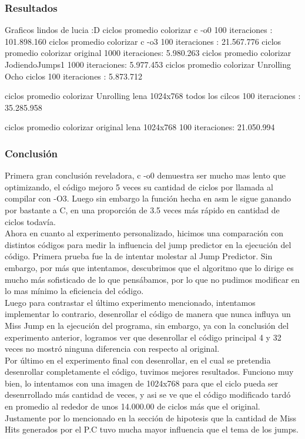 \subsubsection{Resultados}
	Graficos lindos de lucia :D
	ciclos promedio colorizar c -o0 100 iteraciones : 101.898.160
	ciclos promedio colorizar c -o3 100 iteraciones : 21.567.776
	ciclos promedio colorizar original 1000 iteraciones: 5.980.263
	ciclos promedio colorizar JodiendoJumps1 1000 iteraciones: 5.977.453
	ciclos promedio colorizar Unrolling Ocho ciclos 100 iteraciones : 5.873.712
	
	
	
	ciclos promedio colorizar Unrolling lena 1024x768
	 todos los cilcos 100 iteraciones : 35.285.958
	
	ciclos promedio colorizar original lena 1024x768 100 iteraciones:	21.050.994
	
	
	
\subsubsection{Conclusión}
 Primera gran conclusión reveladora, c -o0 demuestra ser mucho mas lento que optimizando, el código mejoro 5 veces su cantidad de ciclos por llamada al compilar con -O3.
  Luego sin embargo la función hecha en asm le sigue ganando por bastante a C, en una proporción de 3.5 veces más rápido en cantidad de ciclos todavía.\\
  Ahora en cuanto al experimento personalizado, hicimos una comparación con distintos códigos para medir la influencia del jump predictor en la ejecución del código. Primera prueba fue la de intentar molestar al Jump Predictor. Sin embargo, por más que intentamos, descubrimos que el algoritmo que lo dirige es mucho más sofisticado de lo que pensábamos, por lo que no pudimos modificar en lo mas mínimo la eficiencia del código. \\
   Luego para contrastar el último experimento mencionado, intentamos implementar lo contrario, desenrollar el código de manera que nunca influya un Miss Jump en la ejecución del programa, sin embargo, ya con la conclusión del experimento anterior, logramos ver que desenrollar el código principal 4 y 32 veces no mostró ninguna diferencia con respecto al original. \\ 
   Por último en el experimento final con desenrollar, en el cual se pretendia desenrollar completamente el código, tuvimos mejores resultados. Funciono muy bien, lo intentamos con una imagen de 1024x768 para que el ciclo pueda ser desenrrollado más cantidad de veces, y asi se ve que el código modificado tardó en promedio al rededor de unos 14.000.00 de ciclos más que el original. Justamente por lo mencionado en la sección de hipotesis que la cantidad de Miss Hits generados por el P.C tuvo mucha mayor influencia que el tema de los jumps.
